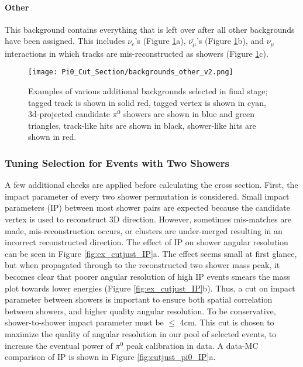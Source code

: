 \paragraph{Other}
This background contains everything that is left over after all other backgrounds have been assigned.  This includes $\nu_e$'s (Figure \ref{fig:backgrounds_other}a), $\overline{\nu_\mu}$'s (Figure \ref{fig:backgrounds_other}b), and $\nu_\mu$ interactions in which tracks are mis-reconstructed as showers (Figure \ref{fig:backgrounds_other}c).

\begin{figure}[H]
\centering
\texttt{[image: Pi0\_Cut\_Section/backgrounds\_other\_v2.png]}
\caption{ Examples of various additional backgrounds selected in final stage; tagged track is shown in solid red, tagged vertex is shown in cyan, 3d-projected candidate $\pi^0$ showers are shown in blue and green triangles, track-like hits are shown in black, shower-like hits are shown in red. }
\label{fig:backgrounds_other}
\end{figure}


\subsubsection{Tuning Selection for Events with Two Showers}
A few additional checks are applied before calculating the cross section.  First, the impact parameter of every two shower permutation is considered.  Small impact parameters (IP) between most shower pairs are expected because the candidate vertex is used to reconstruct 3D direction. However, sometimes mis-matches are made, mis-reconstruction occurs, or clusters are under-merged resulting in an incorrect reconstructed direction. The effect of IP on shower angular resolution can be seen in Figure \ref{fig:ex_cutjust_IP}a. The effect seems small at first glance, but when propagated through to the reconstructed two shower mass peak, it becomes clear that poorer angular resolution of high IP events smears the mass plot towards lower energies (Figure \ref{fig:ex_cutjust_IP}b). Thus, a cut on impact parameter between showers is important to ensure both spatial correlation between showers, and higher quality angular resolution.  To be conservative, shower-to-shower impact parameter must be $\leq$ 4cm.  This cut is chosen to maximize the quality of angular resolution in our pool of selected events, to increase the eventual power of $\pi^0$ peak calibration in data. A data-MC comparison of IP is shown in Figure \ref{fig:cutjust_pi0_IP}a. 

